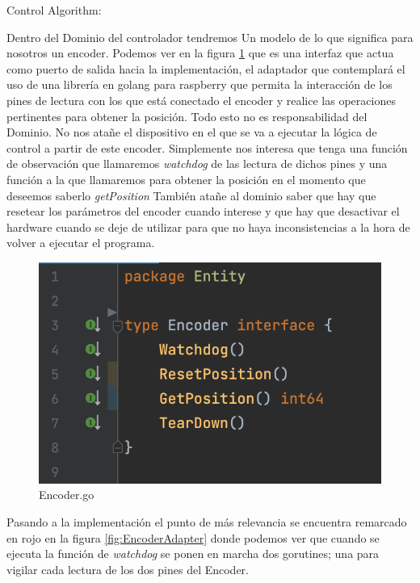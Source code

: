Control Algorithm:



Dentro del Dominio del controlador tendremos Un modelo de lo que significa para nosotros un encoder. Podemos ver en la figura \ref{fig:EncoderInterface} que es una interfaz que actua como puerto de salida hacia la implementación, el adaptador que contemplará el uso de una librería en golang para raspberry que permita la interacción de los pines de lectura con los que está conectado el encoder y realice las operaciones pertinentes para obtener la posición. Todo esto no es responsabilidad del Dominio. No nos atañe el dispositivo en el que se va a ejecutar la lógica de control a partir de este encoder. Simplemente nos interesa que tenga una función de observación que llamaremos \textit{watchdog} de las lectura de dichos pines y una función a la que llamaremos para obtener la posición en el momento que deseemos saberlo \textit{getPosition} También atañe al dominio saber que hay que resetear los parámetros del encoder cuando interese y que hay que desactivar el hardware cuando se deje de utilizar para que no haya inconsistencias a la hora de volver a ejecutar el programa.


\begin{figure}[H]
    \centering
    \includegraphics[height=0.2\textheight]{./part/Ejecucion/Seguimiento/PidControl/img/EncoderInterface}
    \caption{Encoder.go}\label{fig:EncoderInterface}
\end{figure}

Pasando a la implementación el punto de más relevancia se encuentra remarcado en rojo en la figura \ref{fig:EncoderAdapter} donde podemos ver que cuando se ejecuta la función de \textit{watchdog} se ponen en marcha dos gorutines; una para vigilar cada lectura de los dos pines del Encoder.

